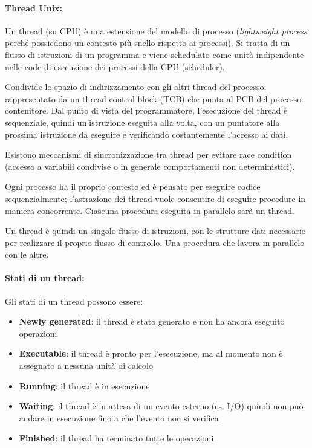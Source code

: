 \paragraph{Thread Unix:} Un thread (su CPU) è una estensione del modello di processo (\textit{lightweight process} perché possiedono un contesto più snello rispetto ai processi). Si tratta di un flusso di istruzioni di un programma e viene schedulato come unità indipendente nelle code di esecuzione dei processi della CPU (scheduler).

Condivide lo spazio di indirizzamento con gli altri thread del processo: rappresentato da un thread control block (TCB) che punta al PCB del processo contenitore. Dal punto di vista del programmatore, l'esecuzione del thread è sequenziale, quindi un'istruzione eseguita alla volta, con un puntatore alla prossima istruzione da eseguire e verificando costantemente l'accesso ai dati.

Esistono meccanismi di sincronizzazione tra thread per evitare race condition (accesso a variabili condivise o in generale comportamenti non deterministici).

Ogni processo ha il proprio contesto ed è pensato per eseguire codice sequenzialmente; l'astrazione dei thread vuole consentire di eseguire procedure in maniera concorrente. Ciascuna procedura eseguita in parallelo sarà un thread.

Un thread è quindi un singolo flusso di istruzioni, con le strutture dati necessarie per realizzare il proprio flusso di controllo. Una procedura che lavora in parallelo con le altre.

\paragraph{Stati di un thread:} Gli stati di un thread possono essere:
\begin{itemize}
	\item \textbf{Newly generated}: il thread è stato generato e non ha ancora eseguito operazioni
	
	\item \textbf{Executable}: il thread è pronto per l'esecuzione, ma al momento non è assegnato a nessuna unità di calcolo
	
	\item \textbf{Running}: il thread è in esecuzione
	
	\item \textbf{Waiting}: il thread è in attesa di un evento esterno (es. I/O) quindi non può andare in esecuzione fino a che l'evento non si verifica
	
	\item \textbf{Finished}: il thread ha terminato tutte le operazioni
\end{itemize}